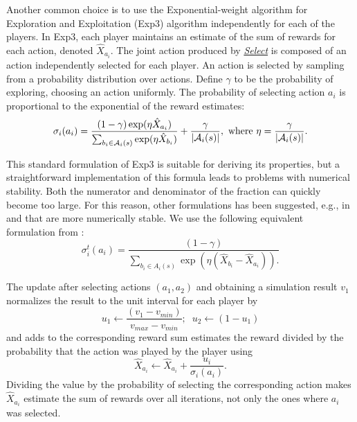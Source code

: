 
Another common choice is to use the Exponential-weight algorithm for Exploration and Exploitation (Exp3)
algorithm \cite{Auer2003Exp3} independently for each of the players.
In Exp3, each player maintains an estimate of the sum of rewards for each action, denoted $\hat{X}_{a_i}$. 
The joint action produced by \emph{\underline{Select}} is composed of an action independently selected for each player.
An action is selected by sampling from a probability distribution over actions.
Define $\gamma$ to be the probability of exploring, \ie choosing an action uniformly. 
The probability of selecting action $a_i$ is proportional to the exponential of the reward estimates:
\begin{equation}\label{eq:exp3select}
\sigma_i(a_i) = \frac{(1-\gamma) \exp(\eta \hat{X}_{a_i})}{\sum_{b_i \in \mathcal{A}_i(s)} \exp(\eta \hat{X}_{b_i})} + \frac{\gamma}{|\mathcal{A}_i(s)|},
  \mbox{ where } \eta = \frac{\gamma}{|\mathcal{A}_i(s)|}.
\end{equation}

This standard formulation of Exp3 is suitable for deriving its properties, but a straightforward implementation of this formula leads to problems with numerical stability. Both the numerator and denominator of the fraction can quickly become too large. For this reason, other formulations has been suggested, e.g., in \cite{Lanctot13Goofspiel} and \cite{Cowling12ISMCTS} that are more numerically stable. We use the following equivalent formulation from \cite{Cowling12ISMCTS}:
\begin{equation}
\sigma^t_i(a_i) = \frac{(1-\gamma)}{\sum_{b_i \in A_i(s)}\exp(\eta(\hat{X}_{b_i}-\hat{X}_{a_i})).}
\end{equation}

The update after selecting actions $(a_1,a_2)$ and obtaining a simulation result $v_1$ normalizes the result to the unit interval for each player by
\begin{equation}
u_1 \leftarrow \frac{(v_1 - v_{min})}{v_{max} - v_{min}};\;\; u_2 \leftarrow (1-u_1)
\end{equation}
and adds to the corresponding reward sum estimates the reward divided by the probability that the action was played by the player using
\begin{equation}
\hat{X}_{a_i} \leftarrow \hat{X}_{a_i} + \frac{u_i}{\sigma_i(a_i)}.
\end{equation}
Dividing the value by the probability of selecting the corresponding action makes $\hat{X}_{a_i}$ estimate the sum of rewards over all
iterations, not only the ones where $a_i$ was selected.

